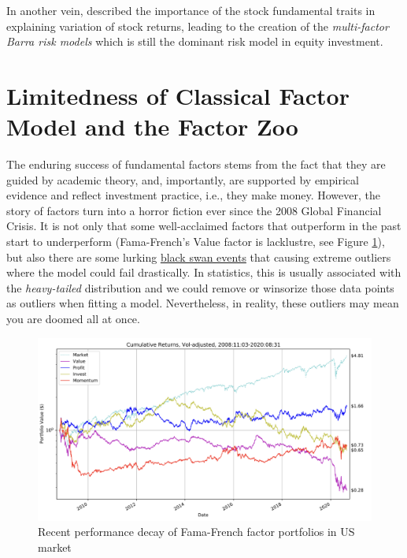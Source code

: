\documentclass[
]{book}
\begin{document}
In another vein, \citet{rosenberg1974extra} described the importance of the stock fundamental traits in explaining variation of stock returns, leading to the creation of the {\emph{multi-factor Barra risk models}} which is still the dominant risk model in equity investment.

\hypertarget{limitedness-of-classical-factor-model-and-the-factor-zoo}{%
\section{Limitedness of Classical Factor Model and the Factor Zoo}\label{limitedness-of-classical-factor-model-and-the-factor-zoo}}

The enduring success of fundamental factors stems from the fact that they are guided by academic theory, and, importantly, are supported by empirical evidence and reflect investment practice, i.e., they make money. However, the story of factors turn into a horror fiction ever since the 2008 Global Financial Crisis. It is not only that some well-acclaimed factors that outperform in the past start to underperform (Fama-French's Value factor is lacklustre, see Figure \ref{fig:fig-fac-decay}), but also there are some lurking \href{https://en.wikipedia.org/wiki/Black_swan_theory}{black swan events} that causing extreme outliers where the model could fail drastically. In statistics, this is usually associated with the {\emph{heavy-tailed}} distribution and we could remove or winsorize those data points as outliers when fitting a model. Nevertheless, in reality, these outliers may mean you are doomed all at once.

\begin{figure}
\includegraphics[width=0.9\linewidth]{images/chapter3/fac_recent} \caption{Recent performance decay of Fama-French factor portfolios in US market}\label{fig:fig-fac-decay}
\end{figure}
\end{document}

